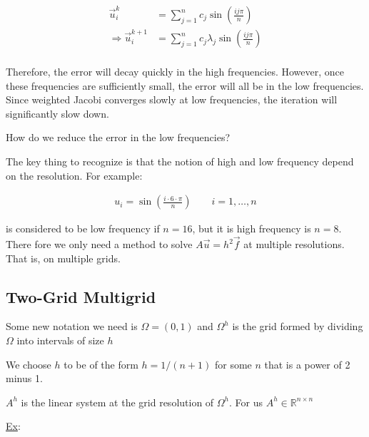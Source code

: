\begin{align*}
  \vec{u}_i^{k} &= \sum_{j=1}^n c_j \sin \left( \frac{ij\pi}{n} \right) \\
  \Rightarrow \vec{u}_i^{k+1} &= \sum_{j=1}^n c_j \lambda_j \sin \left( \frac{ij\pi}{n} \right) \\
\end{align*}

Therefore, the error will decay quickly in the high frequencies. However, once
these frequencies are sufficiently small, the error will all be in the low
frequencies. Since weighted Jacobi converges slowly at low frequencies, the
iteration will significantly slow down.

\begin{displayquote}
How do we reduce the error in the low frequencies?
\end{displayquote}

The key thing to recognize is that the notion of high and low frequency depend
on the resolution. For example:

\begin{align*}
  u_i = \sin \left( \frac{i\cdot 6\cdot \pi}{n} \right) \qquad i=1, \ldots, n
\end{align*}

is considered to be low frequency if $n=16$, but it is high frequency is $n=8$.
There fore we only need a method to solve $A\vec{u}=h^2\vec{f}$ at multiple
resolutions. That is, on multiple grids.

\subsection{Two-Grid Multigrid}

Some new notation we need is $\Omega = (0, 1)$ and $\Omega^h$ is the grid formed
by dividing $\Omega$ into intervals of size $h$

\begin{center}
    
\end{center}

We choose $h$ to be of the form $h=1/(n+1)$ for some $n$ that is a power of 2
minus 1. 

\begin{center}
    
\end{center}
$A^h$ is the linear system at the grid resolution of $\Omega^h$. For us $A^h \in
\mathbb{R}^{n\times n}$

\underline{Ex}:

